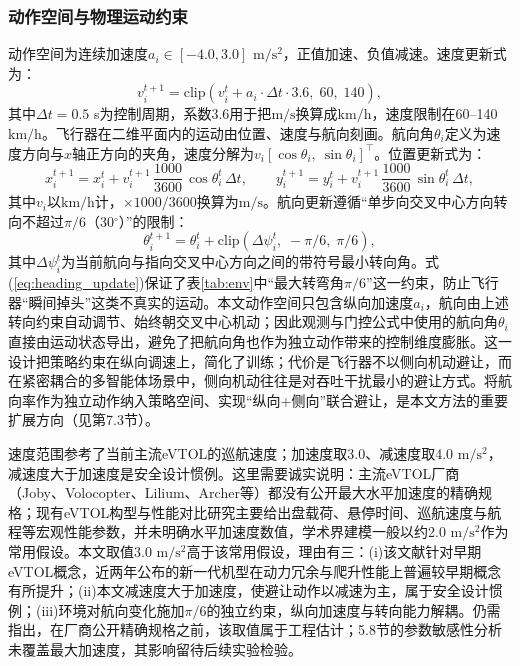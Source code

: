 \documentclass[12pt,a4paper,UTF8]{ctexart}
\begin{document}
\subsubsection{动作空间与物理运动约束}

动作空间为连续加速度$a_i\in[-4.0, 3.0]$ $\mathrm{m/s^2}$，正值加速、负值减速。速度更新式为：
\begin{equation}
    v_i^{t+1} = \text{clip}\!\left(v_i^{t} + a_i \cdot \Delta t \cdot 3.6,\; 60,\; 140\right),
    \label{eq:velocity_update}
\end{equation}
其中$\Delta t=0.5$ s为控制周期，系数3.6用于把$\mathrm{m/s}$换算成$\mathrm{km/h}$，速度限制在60--140 $\mathrm{km/h}$。飞行器在二维平面内的运动由位置、速度与航向刻画。航向角$\theta_i$定义为速度方向与$x$轴正方向的夹角，速度分解为$v_i[\cos\theta_i,\ \sin\theta_i]^{\top}$。位置更新式为：
\begin{equation}
    x_i^{t+1} = x_i^{t} + v_i^{t+1}\,\frac{1000}{3600}\,\cos\theta_i^{t}\,\Delta t,\qquad
    y_i^{t+1} = y_i^{t} + v_i^{t+1}\,\frac{1000}{3600}\,\sin\theta_i^{t}\,\Delta t,
    \label{eq:position_update}
\end{equation}
其中$v_i$以$\mathrm{km/h}$计，$\times1000/3600$换算为$\mathrm{m/s}$。航向更新遵循“单步向交叉中心方向转向不超过$\pi/6$（30$^{\circ}$）”的限制：
\begin{equation}
    \theta_i^{t+1} = \theta_i^{t} + \text{clip}\!\left(\Delta\psi_i^{t},\; -\pi/6,\; \pi/6\right),
    \label{eq:heading_update}
\end{equation}
其中$\Delta\psi_i^{t}$为当前航向与指向交叉中心方向之间的带符号最小转向角。式(\ref{eq:heading_update})保证了表\ref{tab:env}中“最大转弯角$\pi/6$”这一约束，防止飞行器“瞬间掉头”这类不真实的运动。本文动作空间只包含纵向加速度$a_i$，航向由上述转向约束自动调节、始终朝交叉中心机动；因此观测与门控公式中使用的航向角$\theta_i$直接由运动状态导出，避免了把航向角也作为独立动作带来的控制维度膨胀。这一设计把策略约束在纵向调速上，简化了训练；代价是飞行器不以侧向机动避让，而在紧密耦合的多智能体场景中，侧向机动往往是对吞吐干扰最小的避让方式。将航向率作为独立动作纳入策略空间、实现“纵向+侧向”联合避让，是本文方法的重要扩展方向（见第7.3节）。

速度范围参考了当前主流eVTOL的巡航速度；加速度取3.0、减速度取4.0 $\mathrm{m/s^2}$，减速度大于加速度是安全设计惯例。这里需要诚实说明：主流eVTOL厂商（Joby、Volocopter、Lilium、Archer等）都没有公开最大水平加速度的精确规格；现有eVTOL构型与性能对比研究\cite{ref25}主要给出盘载荷、悬停时间、巡航速度与航程等宏观性能参数，并未明确水平加速度数值，学术界建模一般以约2.0 $\mathrm{m/s^2}$作为常用假设。本文取值3.0 $\mathrm{m/s^2}$高于该常用假设，理由有三：(i)该文献针对早期eVTOL概念，近两年公布的新一代机型在动力冗余与爬升性能上普遍较早期概念有所提升；(ii)本文减速度大于加速度，使避让动作以减速为主，属于安全设计惯例；(iii)环境对航向变化施加$\pi/6$的独立约束，纵向加速度与转向能力解耦。仍需指出，在厂商公开精确规格之前，该取值属于工程估计；5.8节的参数敏感性分析未覆盖最大加速度，其影响留待后续实验检验。
\end{document}
